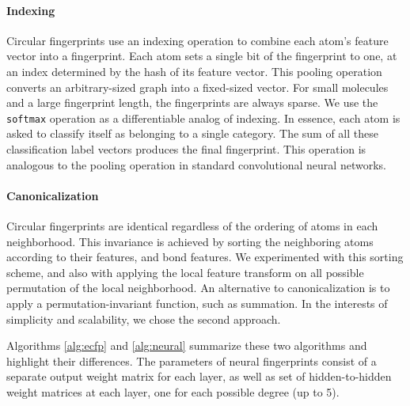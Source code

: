 \documentclass{article}
\begin{document}
\paragraph{Indexing}
Circular fingerprints use an indexing operation to combine each atom's feature vector into a fingerprint.
Each atom sets a single bit of the fingerprint to one, at an index determined by the hash of its feature vector.
This pooling operation converts an arbitrary-sized graph into a fixed-sized vector.
For small molecules and a large fingerprint length, the fingerprints are always sparse.
We use the \texttt{softmax} operation as a differentiable analog of indexing.
In essence, each atom is asked to classify itself as belonging to a single category.
The sum of all these classification label vectors produces the final fingerprint.
This operation is analogous to the pooling operation in standard convolutional neural networks.

\paragraph{Canonicalization}
Circular fingerprints are identical regardless of the ordering of atoms in each neighborhood.
This invariance is achieved by sorting the neighboring atoms according to their features, and bond features.
We experimented with this sorting scheme, and also with applying the local feature transform on all possible permutation of the local neighborhood.
An alternative to canonicalization is to apply a permutation-invariant function, such as summation.
In the interests of simplicity and scalability, we chose the second approach.

Algorithms \ref{alg:ecfp} and \ref{alg:neural} summarize these two algorithms and highlight their differences.
The parameters of neural fingerprints consist of a separate output weight matrix for each layer, as well as set of hidden-to-hidden weight matrices at each layer, one for each possible degree (up to 5).
\end{document}
